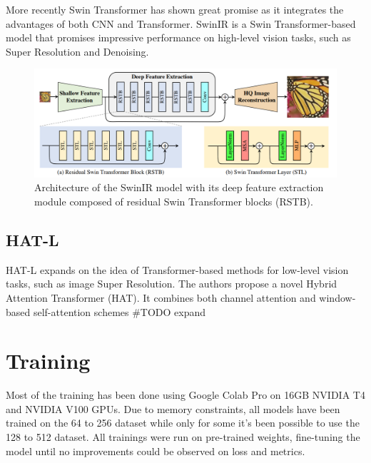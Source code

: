 More recently Swin Transformer\cite{liu2021swin}  has shown great promise as it integrates the advantages of both CNN and
Transformer. SwinIR\cite{liang2021swinir} is a Swin Transformer-based model that promises impressive performance on high-level vision tasks, such as Super Resolution and Denoising.

\begin{figure}[H]
  \centering
  \includegraphics[scale=0.35]{figures/SwinIR.png}
  \caption{Architecture of the SwinIR model with its deep feature extraction module composed of residual Swin Transformer blocks (RSTB).\cite{liang2021swinir}}
  \label{img:swinir}
\end{figure}

\section{HAT-L}
\label{subsec:hatl}

HAT-L expands on the idea of Transformer-based methods for low-level vision tasks, such as image Super Resolution. The authors propose a novel Hybrid Attention Transformer (HAT). It combines both channel attention and window-based self-attention schemes \#TODO expand

\chapter{Training}
\label{cha:Training}

Most of the training has been done using Google Colab Pro on 16GB NVIDIA T4 and NVIDIA V100 GPUs. Due to memory constraints, all models have been trained on the 64 to 256 dataset while only for some it's been possible to use the 128 to 512 dataset.
All trainings were run on pre-trained weights, fine-tuning the model until no improvements could be observed on loss and metrics.

